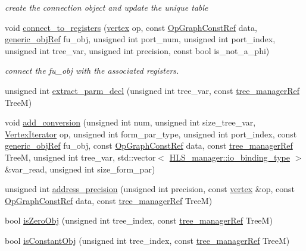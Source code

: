 \begin{DoxyCompactItemize}
\begin{DoxyCompactList}\small\item\em create the connection object and update the unique table \end{DoxyCompactList}\item 
void \hyperlink{classmux__connection__binding_a19eaa5ec4596679c457c35b7aa4061ed}{connect\+\_\+to\+\_\+registers} (\hyperlink{graph_8hpp_abefdcf0544e601805af44eca032cca14}{vertex} op, const \hyperlink{op__graph_8hpp_a9a0b240622c47584bee6951a6f5de746}{Op\+Graph\+Const\+Ref} data, \hyperlink{generic__obj_8hpp_acb533b2ef8e0fe72e09a04d20904ca81}{generic\+\_\+obj\+Ref} fu\+\_\+obj, unsigned int port\+\_\+num, unsigned int port\+\_\+index, unsigned int tree\+\_\+var, unsigned int precision, const bool is\+\_\+not\+\_\+a\+\_\+phi)
\begin{DoxyCompactList}\small\item\em connect the fu\+\_\+obj with the associated registers. \end{DoxyCompactList}\item 
unsigned int \hyperlink{classmux__connection__binding_af62b7f65acce2f389f49634b980c88a6}{extract\+\_\+parm\+\_\+decl} (unsigned int tree\+\_\+var, const \hyperlink{tree__manager_8hpp_a96ff150c071ce11a9a7a1e40590f205e}{tree\+\_\+manager\+Ref} TreeM)
\item 
void \hyperlink{classmux__connection__binding_aa34c2f95532bff6fa7d281583bad6a3f}{add\+\_\+conversion} (unsigned int num, unsigned int size\+\_\+tree\+\_\+var, \hyperlink{graph_8hpp_a80e30b305ae26da1989a155d199d7e2c}{Vertex\+Iterator} op, unsigned int form\+\_\+par\+\_\+type, unsigned int port\+\_\+index, const \hyperlink{generic__obj_8hpp_acb533b2ef8e0fe72e09a04d20904ca81}{generic\+\_\+obj\+Ref} fu\+\_\+obj, const \hyperlink{op__graph_8hpp_a9a0b240622c47584bee6951a6f5de746}{Op\+Graph\+Const\+Ref} data, const \hyperlink{tree__manager_8hpp_a96ff150c071ce11a9a7a1e40590f205e}{tree\+\_\+manager\+Ref} TreeM, unsigned int tree\+\_\+var, std\+::vector$<$ \hyperlink{classHLS__manager_a972627cc658afa992590b9d2bf1a1e87}{H\+L\+S\+\_\+manager\+::io\+\_\+binding\+\_\+type} $>$ \&var\+\_\+read, unsigned int size\+\_\+form\+\_\+par)
\item 
unsigned int \hyperlink{classmux__connection__binding_ac5426fb29f88f4e8a2b1a3dc3cb7be9a}{address\+\_\+precision} (unsigned int precision, const \hyperlink{graph_8hpp_abefdcf0544e601805af44eca032cca14}{vertex} \&op, const \hyperlink{op__graph_8hpp_a9a0b240622c47584bee6951a6f5de746}{Op\+Graph\+Const\+Ref} data, const \hyperlink{tree__manager_8hpp_a96ff150c071ce11a9a7a1e40590f205e}{tree\+\_\+manager\+Ref} TreeM)
\item 
bool \hyperlink{classmux__connection__binding_af8f0423ad663b8a5fb6b9a2f96dde90c}{is\+Zero\+Obj} (unsigned int tree\+\_\+index, const \hyperlink{tree__manager_8hpp_a96ff150c071ce11a9a7a1e40590f205e}{tree\+\_\+manager\+Ref} TreeM)
\item 
bool \hyperlink{classmux__connection__binding_a89c0ed6afea0b88bf31e8e6dcefc0f63}{is\+Constant\+Obj} (unsigned int tree\+\_\+index, const \hyperlink{tree__manager_8hpp_a96ff150c071ce11a9a7a1e40590f205e}{tree\+\_\+manager\+Ref} TreeM)
\end{DoxyCompactItemize}
